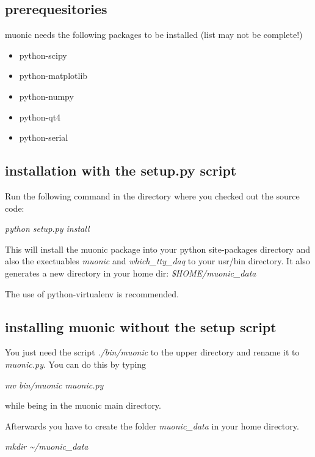 \documentclass[letterpaper,10pt,english]{sphinxmanual}
\begin{document}
\subsection{prerequesitories}
\label{setup:prerequesitories}
muonic needs the following packages to be installed (list may not be complete!)
\begin{itemize}
\item {} 
python-scipy

\item {} 
python-matplotlib

\item {} 
python-numpy

\item {} 
python-qt4

\item {} 
python-serial

\end{itemize}


\subsection{installation with the setup.py script}
\label{setup:installation-with-the-setup-py-script}
Run the following command in the directory where you checked out the source code:

\emph{python setup.py install}

This will install the muonic package into your python site-packages directory and also the exectuables \emph{muonic} and \emph{which\_tty\_daq} to your usr/bin directory. It also generates a new directory in your home dir: \emph{\$HOME/muonic\_data}

The use of python-virtualenv is recommended.


\subsection{installing muonic without the setup script}
\label{setup:installing-muonic-without-the-setup-script}
You just need the script \emph{./bin/muonic} to the upper directory and rename it to \emph{muonic.py}.
You can do this by typing

\emph{mv bin/muonic muonic.py}

while being in the muonic main directory.

Afterwards you have to create the folder \emph{muonic\_data} in your home directory.

\emph{mkdir \textasciitilde{}/muonic\_data}
\end{document}
